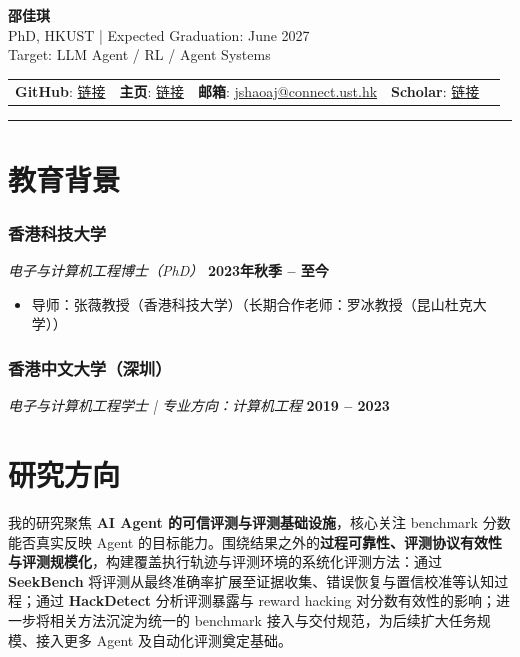 \documentclass[10pt,a4paper]{article}
\begin{document}
\begin{center}
    {\fontsize{28}{34}\selectfont\textbf{\color{namecolor}邵佳琪}} \\ \vspace{0.3em}
    {\color{graytext}\fontsize{11}{13}\selectfont PhD, HKUST | Expected Graduation: June 2027} \\ \vspace{0.15em}
    {\color{graytext}\fontsize{11}{13}\selectfont Target: LLM Agent / RL / Agent Systems} \\ \vspace{0.4em}
    \begin{tabular}{c c c c c}
        \textbf{GitHub}: \href{https://github.com/SHAO-Jiaqi757}{\color{linkcolor}链接} &
        \textbf{主页}: \href{https://shao-jiaqi757.github.io/}{\color{linkcolor}链接} &
        \textbf{邮箱}: \href{mailto:jshaoaj@connect.ust.hk}{\color{linkcolor}jshaoaj@connect.ust.hk} &
        \textbf{Scholar}: \href{https://scholar.google.com/citations?user=P8MtRXMAAAAJ\&hl=zh-CN}{\color{linkcolor}链接}
    \end{tabular}
\end{center}

\noindent\color{accentcolor}\rule{\textwidth}{0.5pt}

\section*{\color{sectioncolor}教育背景}
\subsubsection*{\color{itemcolor}香港科技大学}
\textit{\color{graytext}电子与计算机工程博士（PhD）} \hfill \color{accentcolor}\textbf{2023年秋季 -- 至今}
\begin{itemize}[leftmargin=*]
    \item \small{\color{graytext}导师：张薇教授（香港科技大学）（长期合作老师：罗冰教授（昆山杜克大学））}
\end{itemize}

\subsubsection*{\color{itemcolor}香港中文大学（深圳）}
\textit{\color{graytext}电子与计算机工程学士 | 专业方向：计算机工程} \hfill \color{accentcolor}\textbf{2019 -- 2023}

\section*{\color{sectioncolor}研究方向}
\noindent 我的研究聚焦 \textbf{AI Agent 的可信评测与评测基础设施}，核心关注 benchmark 分数能否真实反映 Agent 的目标能力。围绕结果之外的\textbf{过程可靠性、评测协议有效性与评测规模化}，构建覆盖执行轨迹与评测环境的系统化评测方法：通过 \textbf{SeekBench} 将评测从最终准确率扩展至证据收集、错误恢复与置信校准等认知过程；通过 \textbf{HackDetect} 分析评测暴露与 reward hacking 对分数有效性的影响；进一步将相关方法沉淀为统一的 benchmark 接入与交付规范，为后续扩大任务规模、接入更多 Agent 及自动化评测奠定基础。
\end{document}
